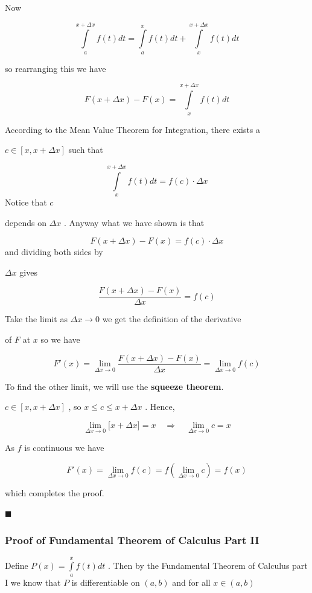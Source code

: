 Now


\[
\int\limits_a^{x+\Delta x}f(t)dt=\int\limits_a^x f(t)dt+\int\limits_x^{x+\Delta x}f(t)dt
\]

so rearranging this we have


\[
F(x+\Delta x)-F(x)=\int\limits_x^{x+\Delta x}f(t)dt
\]


According to the Mean Value Theorem for Integration, there exists a

$c\in[x,x+\Delta x]$ such that


\[
\int\limits_x^{x+\Delta x}f(t)dt=f(c)\cdot\Delta x
\] Notice that $c$

depends on $\Delta x$ . Anyway what we have shown is that


\[
F(x+\Delta x)-F(x)=f(c)\cdot\Delta x
\] and dividing both sides by

$\Delta x$ gives


\[
\frac{F(x+\Delta x)-F(x)}{\Delta x}=f(c)
\]


Take the limit as $\Delta x\to0$ we get the definition of the derivative

of $F$ at $x$ so we have


\[
F'(x)=\lim _{\Delta x\to 0}\frac{F(x+\Delta x)-F(x)}{\Delta x}=\lim _{\Delta x\to 0}f(c)
\]


To find the other limit, we will use the \textbf{squeeze theorem}.

$c\in[x,x+\Delta x]$ , so $x\le c\le x+\Delta x$ . Hence,


\[
\lim _{\Delta x\to0}\Big[x+\Delta x\Big]=x\quad\Rightarrow\quad\lim _{\Delta x\to 0}c=x
\]


As $f$ is continuous we have


\[
F'(x)=\lim _{\Delta x\to0}f(c)=f\left(\lim _{\Delta x\to 0}c\right)=f(x)
\]

which completes the proof.


$\blacksquare$


\subsubsection{Proof of Fundamental Theorem of Calculus Part II}
\label{sss:proo-be95}


Define $P(x)=\int\limits_a^x f(t)dt$ . Then by the Fundamental Theorem of Calculus part I we know that $P$ is differentiable on $(a,b)$ and for all $x\in(a,b)$


